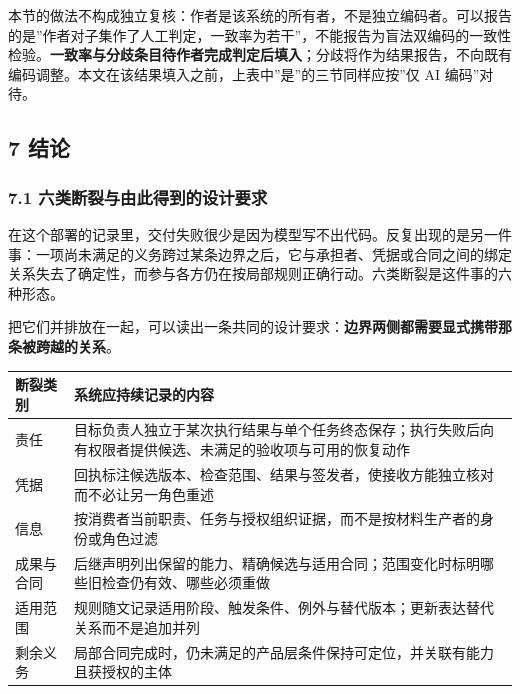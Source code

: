 \documentclass[
]{article}
\newcounter{none} %
\begin{document}
本节的做法不构成独立复核：作者是该系统的所有者，不是独立编码者。可以报告的是''作者对子集作了人工判定，一致率为若干''，不能报告为盲法双编码的一致性检验。\textbf{一致率与分歧条目待作者完成判定后填入}；分歧将作为结果报告，不向既有编码调整。本文在该结果填入之前，上表中''是''的三节同样应按''仅
AI 编码''对待。

\subsection{7 结论}\label{ux7ed3ux8bba}

\subsubsection{7.1
六类断裂与由此得到的设计要求}\label{ux516dux7c7bux65adux88c2ux4e0eux7531ux6b64ux5f97ux5230ux7684ux8bbeux8ba1ux8981ux6c42}

在这个部署的记录里，交付失败很少是因为模型写不出代码。反复出现的是另一件事：一项尚未满足的义务跨过某条边界之后，它与承担者、凭据或合同之间的绑定关系失去了确定性，而参与各方仍在按局部规则正确行动。六类断裂是这件事的六种形态。

把它们并排放在一起，可以读出一条共同的设计要求：\textbf{边界两侧都需要显式携带那条被跨越的关系}。

{\def\LTcaptype{none} %
\begin{longtable}[]{@{}
  >{\raggedright\arraybackslash}p{}
  >{\raggedright\arraybackslash}p{}@{}}
\toprule\noalign{}
\begin{minipage}[b]{\linewidth}\raggedright
断裂类别
\end{minipage} & \begin{minipage}[b]{\linewidth}\raggedright
系统应持续记录的内容
\end{minipage} \\
\midrule\noalign{}
\endhead
\bottomrule\noalign{}
\endlastfoot
责任 &
目标负责人独立于某次执行结果与单个任务终态保存；执行失败后向有权限者提供候选、未满足的验收项与可用的恢复动作 \\
凭据 &
回执标注候选版本、检查范围、结果与签发者，使接收方能独立核对而不必让另一角色重述 \\
信息 &
按消费者当前职责、任务与授权组织证据，而不是按材料生产者的身份或角色过滤 \\
成果与合同 &
后继声明列出保留的能力、精确候选与适用合同；范围变化时标明哪些旧检查仍有效、哪些必须重做 \\
适用范围 &
规则随文记录适用阶段、触发条件、例外与替代版本；更新表达替代关系而不是追加并列 \\
剩余义务 &
局部合同完成时，仍未满足的产品层条件保持可定位，并关联有能力且获授权的主体 \\
\end{longtable}
}
\end{document}
